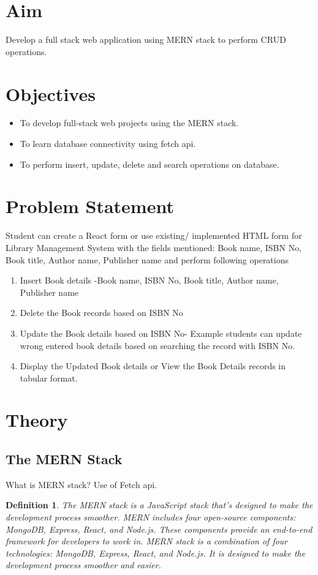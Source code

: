 \documentclass[11pt]{article}
\newtheorem{dfn}[thm]{Definition}
\begin{document}
\tableofcontents
\thispagestyle{empty}
\clearpage

\setcounter{page}{1}

\section{Aim}
Develop a full stack web application using MERN stack to perform CRUD operations.

\section{Objectives}
\begin{itemize}
   \item To develop full-stack web projects using the MERN stack.
   \item To learn database connectivity using fetch api.
   \item To perform insert, update, delete and search operations on database.
\end{itemize}

\section{Problem Statement}
Student can create a React form or use existing/ implemented HTML form for Library
Management System with the fields mentioned: Book name, ISBN No, Book title, Author name,
Publisher name and perform following operations

\begin{enumerate}
    \item Insert Book details -Book name, ISBN No, Book title, Author name, Publisher name
    \item Delete the Book records based on ISBN No
    \item Update the Book details based on ISBN No- Example students can update wrong entered book details based on searching the record with ISBN No.
    \item Display the Updated Book details or View the Book Details records in tabular format.
\end{enumerate}

\section{Theory}

\subsection{The MERN Stack}
What is MERN stack?
Use of Fetch api.
\begin{dfn}
    The MERN stack is a JavaScript stack that’s designed to make the development process smoother. MERN includes four open-source components: MongoDB, Express, React, and Node.js. These components provide an end-to-end framework for developers to work in. MERN stack is a combination of four technologies: MongoDB, Express, React, and Node.js. It is designed to make the development process smoother and easier.
\end{dfn}
\end{document}

